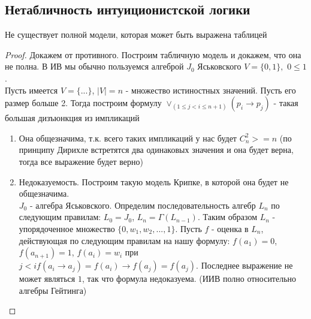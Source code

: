 \subsection{Нетабличность интуиционистской логики}
\label{sec-6-5}
\begin{theorem}
Не существует полной модели, которая может быть выражена таблицей 
\end{theorem}
\begin{proof}
Докажем от противного. Построим табличную модель и докажем, что она не полна. В ИВ мы обычно пользуемся алгеброй $J_{0}$ Яськовского $V = \lbrace 0, 1 \rbrace,$ $0 \leq 1$.\\
Пусть имеется $V = \lbrace ... \rbrace$, $\vert V \vert = n$ - множество истиностных значений. Пусть его размер больше 2. Тогда построим формулу $\vee_{(1 \leq j < i \leq n + 1)}(p_{i} \rightarrow p_{j})$ - такая большая дизъюнкция из импликаций
\begin{enumerate}
\item Она общезначима, т.к. всего таких импликаций у нас будет $C_{n}^{2} >= n$ (по принципу Дирихле встретятся два одинаковых значения и она будет верна, тогда все выражение будет верно)
\item Недоказуемость. Построим такую модель Крипке, в которой она будет не общезначима.\\
$J_{0}$ - алгебра Яськовского. Определим последовательность алгебр $L_{n}$ по следующим правилам: $L_{0} = J_{0}$, $L_{n} = \Gamma(L_{n - 1})$. Таким образом $L_{n}$ - упорядоченное множество $\lbrace 0, w_{1}, w_{2}, ..., 1 \rbrace$. Пусть $f$ - оценка в $L_{n}$, действующая по следующим правилам на нашу формулу: $f(a_{1}) = 0$, $f(a_{n+1}) = 1$, $f(a_{i}) = w_{i}$ при $j < i f(a_{i} \rightarrow a_{j}) = f(a_{i}) \rightarrow f(a_{j}) = f(a_{j})$. Последнее выражение не может являться $1$, так что формула недоказуема. (ИИВ полно относительно алгебры Гейтинга)
\end{enumerate}
\end{proof}
